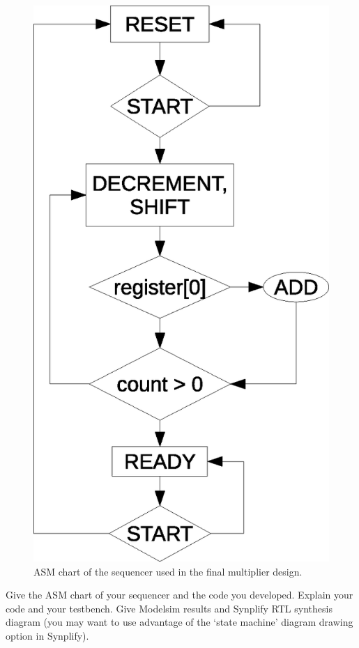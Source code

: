 \documentclass[a4paper,11pt]{article}
\begin{document}
\begin{figure}
    \centering
        \includegraphics[scale=0.65]{finalSequencerASM.eps}
    \caption{ASM chart of the sequencer used in the final multiplier design.}
    \label{fig:fseqASM}
\end{figure}

Give the ASM chart of your sequencer and the code you developed. Explain your code and your testbench.  Give Modelsim results and Synplify RTL synthesis diagram (you may want to use advantage of the ‘state machine’ diagram drawing option in Synplify). 
\end{document}
